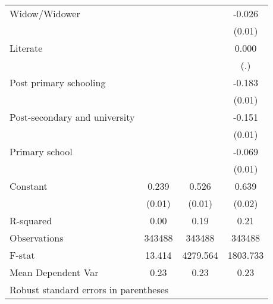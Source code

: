 {\begin{tabular}{l*{3}{c}}
Widow/Widower       &                     &                     &      -0.026         \\
                    &                     &                     &      (0.01)         \\
Literate            &                     &                     &       0.000         \\
                    &                     &                     &         (.)         \\
Post primary schooling&                     &                     &      -0.183\sym{***}\\
                    &                     &                     &      (0.01)         \\
Post-secondary and university&                     &                     &      -0.151\sym{***}\\
                    &                     &                     &      (0.01)         \\
Primary school      &                     &                     &      -0.069\sym{***}\\
                    &                     &                     &      (0.01)         \\
Constant            &       0.239\sym{***}&       0.526\sym{***}&       0.639\sym{***}\\
                    &      (0.01)         &      (0.01)         &      (0.02)         \\
\hline
R-squared           &        0.00         &        0.19         &        0.21         \\
Observations        &      343488         &      343488         &      343488         \\
F-stat              &      13.414         &    4279.564         &    1803.733         \\
Mean Dependent Var  &        0.23         &        0.23         &        0.23         \\
\hline\hline
\multicolumn{4}{l}{\footnotesize Robust standard errors in parentheses}\\
\end{tabular}
}
